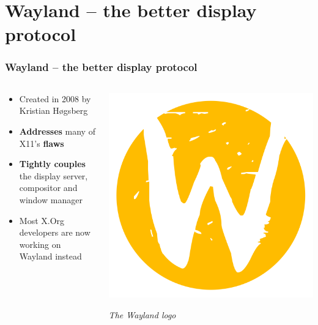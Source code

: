\documentclass{beamer}
\begin{document}
\section{Wayland -- the better display protocol}
\begin{frame}
  \frametitle{Wayland -- the better display protocol}
  \begin{columns}[T]
    \begin{column}{0.7\textwidth}
      \begin{itemize}
        \item Created in 2008 by Kristian Høgsberg
        \item \textbf{Addresses} many of X11's \textbf{flaws}
        \item \textbf{Tightly couples} the display server, compositor and window manager
        \item Most X.Org developers are now working on Wayland instead
      \end{itemize}
    \end{column}
    \begin{column}{0.3\textwidth}
      \includegraphics[width=\textwidth]{Wayland_Logo.png}

      \textit{\footnotesize The Wayland logo}
    \end{column}
  \end{columns}
\end{frame}
\end{document}
